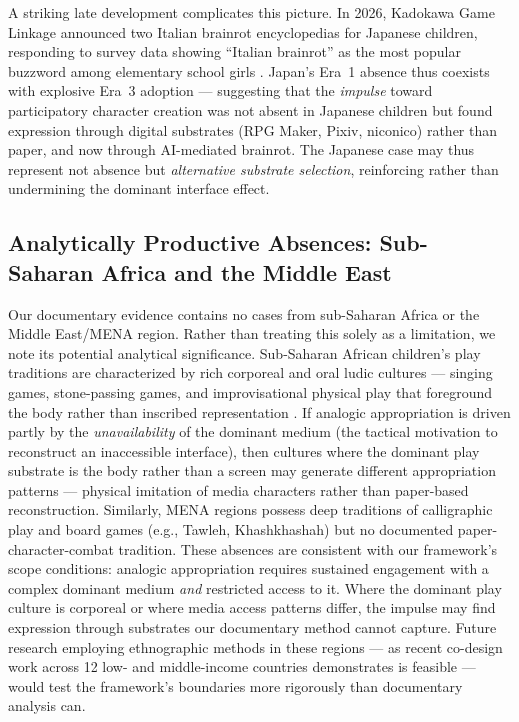 \documentclass[12pt]{article}
\begin{document}
A striking late development complicates this picture. In 2026, Kadokawa Game Linkage announced two Italian brainrot encyclopedias for Japanese children, responding to survey data showing ``Italian brainrot'' as the most popular buzzword among elementary school girls \citep{automaton2026}. Japan's Era~1 absence thus coexists with explosive Era~3 adoption --- suggesting that the \emph{impulse} toward participatory character creation was not absent in Japanese children but found expression through digital substrates (RPG Maker, Pixiv, niconico) rather than paper, and now through AI-mediated brainrot. The Japanese case may thus represent not absence but \emph{alternative substrate selection}, reinforcing rather than undermining the dominant interface effect.

\subsection{Analytically Productive Absences: Sub-Saharan Africa and the Middle East}

Our documentary evidence contains no cases from sub-Saharan Africa or the Middle East/MENA region. Rather than treating this solely as a limitation, we note its potential analytical significance. Sub-Saharan African children's play traditions are characterized by rich corporeal and oral ludic cultures --- singing games, stone-passing games, and improvisational physical play that foreground the body rather than inscribed representation \citep{chinyowa2024}. If analogic appropriation is driven partly by the \emph{unavailability} of the dominant medium (the tactical motivation to reconstruct an inaccessible interface), then cultures where the dominant play substrate is the body rather than a screen may generate different appropriation patterns --- physical imitation of media characters rather than paper-based reconstruction. Similarly, MENA regions possess deep traditions of calligraphic play and board games (e.g., Tawleh, Khashkhashah) but no documented paper-character-combat tradition. These absences are consistent with our framework's scope conditions: analogic appropriation requires sustained engagement with a complex dominant medium \emph{and} restricted access to it. Where the dominant play culture is corporeal or where media access patterns differ, the impulse may find expression through substrates our documentary method cannot capture. Future research employing ethnographic methods in these regions --- as recent co-design work across 12 low- and middle-income countries demonstrates is feasible \citep{iannelli2026} --- would test the framework's boundaries more rigorously than documentary analysis can.
\end{document}
